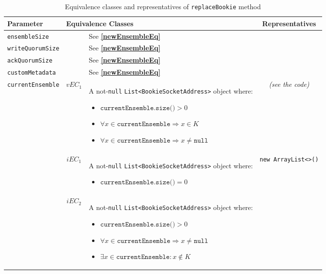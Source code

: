 \documentclass[sigconf]{acmart}
\begin{document}
\begin{table*}
\footnotesize
\caption{Equivalence classes and representatives of \texttt{replaceBookie} method}
\label{replaceBookieEq}
\centering
\begin{tabular}{l|cm{10.5cm}|c}
\toprule
 
\textbf{Parameter} & \multicolumn{2}{|l|}{\textbf{Equivalence Classes}} & \textbf{Representatives} \\
\midrule
    
\texttt{ensembleSize} & & See \textbf{\cref{newEnsembleEq}} &

\\\hline

\texttt{writeQuorumSize} & & See \textbf{\cref{newEnsembleEq}} &
	
\\\hline

\texttt{ackQuorumSize} & & See \textbf{\cref{newEnsembleEq}} &

\\\hline

\texttt{customMetadata} & & See \textbf{\cref{newEnsembleEq}} &

\\\hline

\texttt{currentEnsemble} & $vEC_1$ & A not-\texttt{null} \texttt{List<BookieSocketAddress>} object where:
\begin{itemize}
\item $\texttt{currentEnsemble.size()} > 0$
\item $\forall x \in \texttt{currentEnsemble} \Rightarrow x \in K$
\item $\forall x \in \texttt{currentEnsemble} \Rightarrow x \neq \texttt{null}$
\end{itemize}

& \textit{(see the code)}

\\\cline{2-4}   

& $iEC_1$ & A not-\texttt{null} \texttt{List<BookieSocketAddress>} object where:
\begin{itemize}
\item $\texttt{currentEnsemble.size()} = 0$
\end{itemize}

& \texttt{new ArrayList<>()}

\\\cline{2-4}   

& $iEC_2$ & A not-\texttt{null} \texttt{List<BookieSocketAddress>} object where:
\begin{itemize}
\item $\texttt{currentEnsemble.size()} > 0$
\item $\forall x \in \texttt{currentEnsemble} \Rightarrow x \neq \texttt{null}$
\item $\exists x \in \texttt{currentEnsemble} : x \notin K$
\end{itemize}


\end{tabular}
\end{table*}
\end{document}
